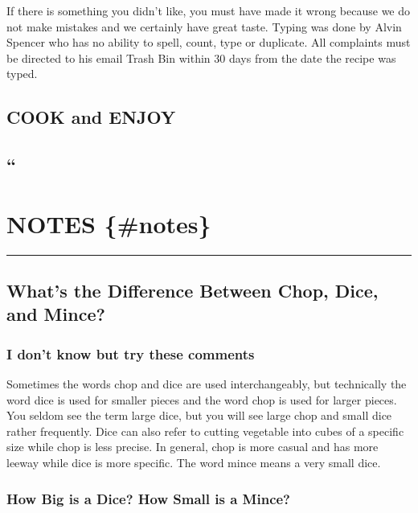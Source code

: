 \documentclass[
]{book}
\begin{document}
If there is something you didn't like, you must have made it wrong because we do not make mistakes and we certainly have great taste. Typing was done by Alvin Spencer who has no ability to spell, count, type or duplicate. All complaints must be directed to his email Trash Bin within 30 days from the date the recipe was typed.

\hypertarget{cook-and-enjoy}{%
\section*{COOK and ENJOY}\label{cook-and-enjoy}}


\hypertarget{section}{%
\section{``}\label{section}}

\hypertarget{notes-notes}{%
\chapter*{NOTES \{\#notes\}}\label{notes-notes}}


\begin{center}\rule{0.5\linewidth}{0.5pt}\end{center}

\hypertarget{notes}{%
\section*{What's the Difference Between Chop, Dice, and Mince?}\label{notes}}


\hypertarget{i-dont-know-but-try-these-comments}{%
\subsection*{I don't know but try these comments}\label{i-dont-know-but-try-these-comments}}


Sometimes the words chop and dice are used interchangeably, but technically the word dice is used for smaller
pieces and the word chop is used for larger pieces.
You seldom see the term large dice, but you will see large chop and small dice rather frequently.
Dice can also refer to cutting vegetable into cubes of a specific size while chop is less precise.
In general, chop is more casual and has more leeway while dice is more specific.
The word mince means a very small dice.

\hypertarget{how-big-is-a-dice-how-small-is-a-mince}{%
\subsection*{How Big is a Dice? How Small is a Mince?}\label{how-big-is-a-dice-how-small-is-a-mince}}
\end{document}
